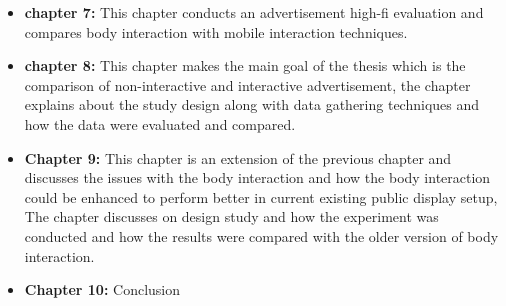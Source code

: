 \begin{itemize}
\item \textbf{chapter 7:}
This chapter conducts an advertisement high-fi evaluation and compares body interaction with mobile interaction techniques.


\item \textbf{chapter 8:}
This chapter makes the main goal of the thesis which is the comparison of non-interactive and interactive advertisement, the chapter explains about the study design along with data gathering techniques and how the data were evaluated and compared.


\item \textbf{Chapter 9:}
This chapter is an extension of the previous chapter and discusses the issues with the body interaction and how the body interaction could be enhanced to perform better in current existing public display setup, The chapter discusses on design study and how the experiment was conducted and how the results were compared with the older version of body interaction. 


\item \textbf{Chapter 10:}
Conclusion

\end{itemize}

